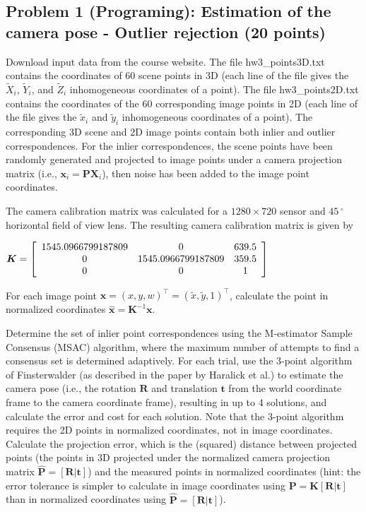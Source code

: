 \documentclass[11pt]{article}
\begin{document}
    \subsection{Problem 1 (Programing): Estimation of the camera pose -
Outlier rejection (20
points)}\label{problem-1-programing-estimation-of-the-camera-pose---outlier-rejection-20-points}

Download input data from the course website. The file hw3\_points3D.txt
contains the coordinates of 60 scene points in 3D (each line of the file
gives the \(\tilde{X}_i\), \(\tilde{Y}_i\), and \(\tilde{Z}_i\)
inhomogeneous coordinates of a point). The file hw3\_points2D.txt
contains the coordinates of the 60 corresponding image points in 2D
(each line of the file gives the \(\tilde{x}_i\) and \(\tilde{y}_i\)
inhomogeneous coordinates of a point). The corresponding 3D scene and 2D
image points contain both inlier and outlier correspondences. For the
inlier correspondences, the scene points have been randomly generated
and projected to image points under a camera projection matrix (i.e.,
\(\boldsymbol{x}_i = \boldsymbol{P}  \boldsymbol{X}_i\)), then noise has
been added to the image point coordinates.

The camera calibration matrix was calculated for a \(1280 \times 720\)
sensor and \(45\,^\circ\) horizontal field of view lens. The resulting
camera calibration matrix is given by

\(\boldsymbol{K} = \left[  \begin{array}{c c c}  1545.0966799187809 & 0 & 639.5\\  0 & 1545.0966799187809 & 359.5\\  0 & 0 & 1  \end{array}\right]\)

For each image point
\(\boldsymbol{x} = (x, y, w)^\top = (\tilde{x},  \tilde{y}, 1)^\top\),
calculate the point in normalized coordinates
\(\hat{\boldsymbol{x}} = \boldsymbol{K}^{-1} \boldsymbol{x}\).

Determine the set of inlier point correspondences using the M-estimator
Sample Consensus (MSAC) algorithm, where the maximum number of attempts
to find a consensus set is determined adaptively. For each trial, use
the 3-point algorithm of Finsterwalder (as described in the paper by
Haralick et al.) to estimate the camera pose (i.e., the rotation
\(\boldsymbol{R}\) and translation \(\boldsymbol{t}\) from the world
coordinate frame to the camera coordinate frame), resulting in up to 4
solutions, and calculate the error and cost for each solution. Note that
the 3-point algorithm requires the 2D points in normalized coordinates,
not in image coordinates. Calculate the projection error, which is the
(squared) distance between projected points (the points in 3D projected
under the normalized camera projection matrix
\(\hat{\boldsymbol{P}} = [\boldsymbol{R} | \boldsymbol{t}]\)) and the
measured points in normalized coordinates (hint: the error tolerance is
simpler to calculate in image coordinates using
\(\boldsymbol{P} =  \boldsymbol{K} [\boldsymbol{R} | \boldsymbol{t}]\)
than in normalized coordinates using
\(\hat{\boldsymbol{P}} = [\boldsymbol{R} | \boldsymbol{t}]\)).
\end{document}

